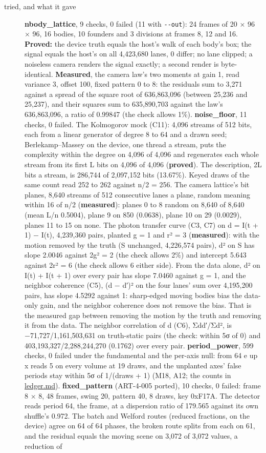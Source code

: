 \begin{description}
\item[{tried, and what it gave}] \textbf{nbody\_\allowbreak{}lattice}, 9 checks, 0 failed (11 with \texttt{-\allowbreak{}-\allowbreak{}out}): 24 frames of 20 × 96 × 96, 16 bodies, 10 founders and 3 divisions at frames 8, 12 and 16. \textbf{Proved:} the device truth equals the host's walk of each body's box; the signal equals the host's on all 4,423,680 lanes, 0 differ; no lane clipped; a noiseless camera renders the signal exactly; a second render is byte-identical. \textbf{Measured}, the camera law's two moments at gain 1, read variance 3, offset 100, fixed pattern 0 to 8: the residuals sum to 3,271 against a spread of the square root of 636,863,096 (between 25,236 and 25,237), and their squares sum to 635,890,703 against the law's 636,863,096, a ratio of 0.99847 (the check allows 1\%). \textbf{noise\_\allowbreak{}floor}, 11 checks, 0 failed. The Kolmogorov mock (C11): 4,096 streams of 512 bits, each from a linear generator of degree 8 to 64 and a drawn seed; Berlekamp–Massey on the device, one thread a stream, puts the complexity within the degree on 4,096 of 4,096 and regenerates each whole stream from its first L bits on 4,096 of 4,096 (\textbf{proved}). The description, 2L bits a stream, is 286,744 of 2,097,152 bits (13.67\%). Keyed draws of the same count read 252 to 262 against n/2 = 256. The camera lattice's bit planes, 8,640 streams of 512 consecutive lanes a plane, random meaning within 16 of n/2 (\textbf{measured}): planes 0 to 8 random on 8,640 of 8,640 (mean L/n 0.5004), plane 9 on 850 (0.0638), plane 10 on 29 (0.0029), planes 11 to 15 on none. The photon transfer curve (C3, C7) on d = I(t + 1) − I(t), 4,239,360 pairs, planted g = 1 and r² = 3 (\textbf{measured}): with the motion removed by the truth (S unchanged, 4,226,574 pairs), d² on S has slope 2.0046 against 2g² = 2 (the check allows 2\%) and intercept 5.643 against 2r² = 6 (the check allows 6 either side). From the data alone, d² on I(t) + I(t + 1) over every pair has slope 7.0460 against g = 1, and the neighbor coherence (C5), (d − d′)² on the four lanes' sum over 4,195,200 pairs, has slope 4.5292 against 1: sharp-edged moving bodies bias the data-only gain, and the neighbor coherence does not remove the bias. That is the measured gap between removing the motion by the truth and removing it from the data. The neighbor correlation of d (C6), Σdd′/Σd², is −71,727/1,161,503,631 on truth-static pairs (the check: within 5σ of 0) and 403,193,327/2,288,244,270 (0.1762) over every pair. \textbf{period\_\allowbreak{}power}, 599 checks, 0 failed under the fundamental and the per-axis null: from 64 e up x reads 5 on every volume at 19 draws, and the unplanted axes' false periods stay within 5σ of 1/(draws + 1) (M18, A12; the counts in \hyperref[chap:ledger]{ledger.md}). \textbf{fixed\_\allowbreak{}pattern} (ART-4-005 ported), 10 checks, 0 failed: frame 8 × 8, 48 frames, swing 20, pattern 40, 8 draws, key 0xF17A. The detector reads period 64, the frame, at a dispersion ratio of 179.565 against its own shuffle's 0.972. The batch and Welford routes (reduced fractions, on the device) agree on 64 of 64 phases, the broken route splits from each on 61, and the residual equals the moving scene on 3,072 of 3,072 values, a reduction of 
\end{description}

